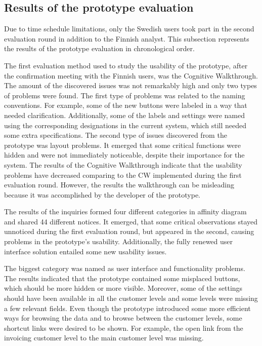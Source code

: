 \documentclass[12pt,a4paper,oneside,pdftex]{report}
\begin{document}
\subsection{Results of the prototype evaluation}

Due to time schedule limitations, only the Swedish users took part in the second evaluation round in addition to the Finnish analyst. This subsection represents the results of the prototype evaluation in chronological order. 

The first evaluation method used to study the usability of the prototype, after the confirmation meeting with the Finnish users, was the Cognitive Walkthrough. The amount of the discovered issues was not remarkably high and only two types of problems were found. The first type of problems was related to the naming conventions. For example, some of the new buttons were labeled in a way that needed clarification. Additionally, some of the labels and settings were named using the corresponding designations in the current system, which still needed some extra specifications. The second type of issues discovered from the prototype was layout problems. It emerged that some critical functions were hidden and were not immediately noticeable, despite their importance for the system. The results of the Cognitive Walkthrough indicate that the usability problems have decreased comparing to the CW implemented during the first evaluation round. However, the results the walkthrough can be misleading because it was accomplished by the developer of the prototype.

The results of the inquiries formed four different categories in affinity diagram and shared 44 different notices. It emerged, that some critical observations stayed unnoticed during the first evaluation round, but appeared in the second, causing problems in the prototype's usability. Additionally, the fully renewed user interface solution entailed some new usability issues. 

The biggest category was named as user interface and functionality problems. The results indicated that the prototype contained some misplaced buttons, which should be more hidden or more visible. Moreover, some of the settings should have been available in all the customer levels and some levels were missing a few relevant fields. Even though the prototype introduced some more efficient ways for browsing the data and to browse between the customer levels, some shortcut links were desired to be shown. For example, the open link from the invoicing customer level to the main customer level was missing.  
\end{document}

